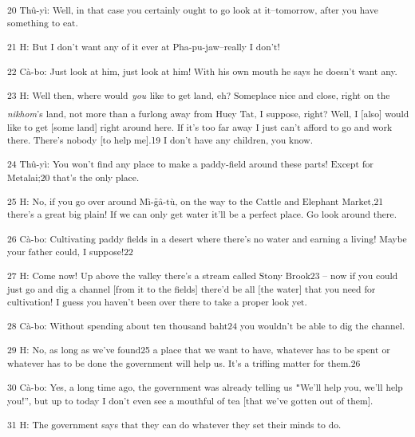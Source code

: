 {\textsuperscript{20 Thû-yì: Well, in that case you certainly ought to
go look at it--tomorrow, after you have something to eat.}}

{\textsuperscript{21 H: But I don't want any of it ever at Pha-pu-jaw--really
I don't!}}

{\textsuperscript{22 Cà-bo: Just look at him, just look at him! With his
own mouth he says he doesn't want any.}}

{\textsuperscript{23 H: Well then, where would }}{\textsuperscript{\textit{you}}}{\textsuperscript{
like to get land, eh? Someplace nice and close, right on the }}{\textsuperscript{\textit{nikhom}}}{\textsuperscript{'s
land, not more than a furlong away from Huey Tat, I suppose, right? Well, I [also]
would like to get [some land] right around here. If it's too far away I just can't
afford to go and work there. There's nobody [to help me].19 I don't have any children,
you know.}}

{\textsuperscript{24 Thû-yì: You won't find any place to make a paddy-field
around these parts! Except for Metalai;20 that's the only place.}}

{\textsuperscript{25 H: No, if you go over around Mì-g̈â-tù, on the
way to the Cattle and Elephant Market,21 there's a great big plain! If we can only
get water it'll be a perfect place. Go look around there. }}

{\textsuperscript{26 Cà-bo: Cultivating paddy fields in a desert where
there's no water and earning a living! Maybe your father could, I suppose!22}}

{\textsuperscript{27 H: Come now! Up above the valley there's a stream called
Stony Brook23 -- now if you could just go and dig a channel [from it to the fields]
there'd be all [the water] that you need for cultivation! I guess you haven't been
over there to take a proper look yet. }}

{\textsuperscript{28 Cà-bo: Without spending about ten thousand baht24
you wouldn't be able to dig the channel. }}

{\textsuperscript{29 H: No, as long as we've found25 a place that we want
to have, whatever has to be spent or whatever has to be done the government will
help us. It's a trifling matter for them.26}}

{\textsuperscript{30 Cà-bo: Yes, a long time ago, the government was already
telling us \texttt{"}We'll help you, we'll help you!'', but up to today I don't
even see a mouthful of tea [that we've gotten out of them].}}

{\textsuperscript{31 H: The government says that they can do whatever they
set their minds to do. }}

